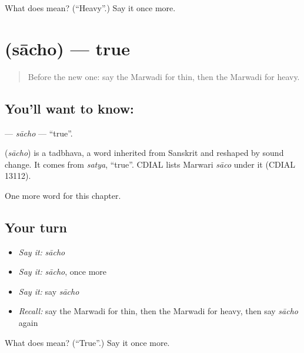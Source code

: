 \begin{tcolorbox}[breakable,colback=teal!4,colframe=teal!35!black,title={Before you move on}]
What does  mean? (\textquotedblleft{}Heavy\textquotedblright{}.) Say it once more.
\end{tcolorbox}
\section[\texorpdfstring{\mw{साचो} (sācho)}{साचो (sācho)}]{ (sācho) — true}

\label{lesson:MW-C76-sacho}



\begin{quote}
Before the new one: say the Marwadi for thin, then the Marwadi for heavy.
\end{quote}

\subsection*{You'll want to know: }
\textbf{} — \emph{sācho} — \textquotedblleft{}true\textquotedblright{}.

\begin{cousinweb}
\textbf{} (\emph{sācho}) is a tadbhava, a word inherited from Sanskrit and reshaped by sound change. It comes from \emph{satya}, \textquotedblleft{}true\textquotedblright{}. CDIAL lists Marwari \emph{sāco} under it (CDIAL 13112).
\end{cousinweb}

\begin{grammarlens}[title={What you've built}]
One more word for this chapter.
\end{grammarlens}

\subsection*{Your turn}
\begin{itemize}
\raggedright
  \item \emph{Say it:} \emph{sācho}
  \item \emph{Say it:} \emph{sācho}, once more
  \item \emph{Say it:} say \emph{sācho}
  \item \emph{Recall:} say the Marwadi for thin, then the Marwadi for heavy, then say \emph{sācho} again
\end{itemize}

\begin{tcolorbox}[breakable,colback=teal!4,colframe=teal!35!black,title={Before you move on}]
What does  mean? (\textquotedblleft{}True\textquotedblright{}.) Say it once more.
\end{tcolorbox}
